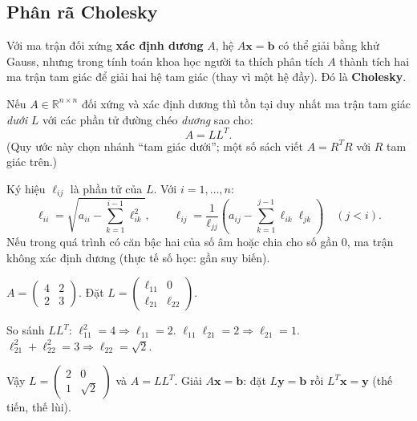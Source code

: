 \documentclass[12pt,a4paper]{article}
\begin{document}
\subsection{Phân rã Cholesky}

\begin{dongco}
Với ma trận đối xứng \textbf{xác định dương} $A$, hệ $A\mathbf{x} = \mathbf{b}$ có thể giải bằng khử Gauss, nhưng trong tính toán khoa học người ta thích phân tích $A$ thành tích hai ma trận tam giác để giải hai hệ tam giác (thay vì một hệ đầy). Đó là \textbf{Cholesky}.
\end{dongco}

\begin{dinhly}[title={Phân rã Cholesky}]
Nếu $A \in \mathbb{R}^{n \times n}$ đối xứng và xác định dương thì tồn tại duy nhất ma trận tam giác \emph{dưới} $L$ với các phần tử đường chéo \emph{dương} sao cho:
\[
  A = L L^T.
\]
(Quy ước này chọn nhánh ``tam giác dưới''; một số sách viết $A = R^T R$ với $R$ tam giác trên.)
\end{dinhly}

\begin{phuongphap}[title={Thuật toán (tóm tắt)}]
Ký hiệu $\ell_{ij}$ là phần tử của $L$. Với $i = 1, \ldots, n$:
\[
  \ell_{ii} = \sqrt{a_{ii} - \sum_{k=1}^{i-1} \ell_{ik}^2},\qquad
  \ell_{ij} = \dfrac{1}{\ell_{jj}}\left(a_{ij} - \sum_{k=1}^{j-1} \ell_{ik}\ell_{jk}\right)\quad (j < i).
\]
Nếu trong quá trình có căn bậc hai của số âm hoặc chia cho số gần 0, ma trận không xác định dương (thực tế số học: gần suy biến).
\end{phuongphap}

\begin{vidu}[title={Cholesky cấp $2 \times 2$}]
$A = \begin{pmatrix}4 & 2\\ 2 & 3\end{pmatrix}$. Đặt $L = \begin{pmatrix}\ell_{11} & 0\\ \ell_{21} & \ell_{22}\end{pmatrix}$.

So sánh $LL^T$: $\ell_{11}^2 = 4 \Rightarrow \ell_{11} = 2$. $\ell_{11}\ell_{21} = 2 \Rightarrow \ell_{21} = 1$. $\ell_{21}^2 + \ell_{22}^2 = 3 \Rightarrow \ell_{22} = \sqrt{2}$.

Vậy $L = \begin{pmatrix}2 & 0\\ 1 & \sqrt{2}\end{pmatrix}$ và $A = LL^T$. Giải $A\mathbf{x} = \mathbf{b}$: đặt $L\mathbf{y} = \mathbf{b}$ rồi $L^T \mathbf{x} = \mathbf{y}$ (thế tiến, thế lùi).
\end{vidu}
\end{document}
